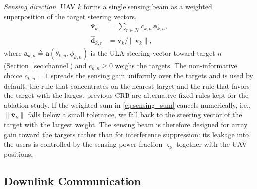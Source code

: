 \documentclass[conference]{IEEEtran}
\begin{document}
\emph{Sensing direction.} UAV $k$ forms a single sensing beam as a weighted superposition of the target steering vectors,
\begin{align}
\bar{\mathbf v}_k&=\sum_{n\in\mathcal N}c_{k,n}\,\mathbf a_{k,n},\label{eq:sensing_sum}\\
\hat{\mathbf d}_{k,r}&=\bar{\mathbf v}_k\big/\|\bar{\mathbf v}_k\|,\label{eq:sensing_dir}
\end{align}
where $\mathbf a_{k,n}\triangleq\mathbf a(\theta_{k,n},\phi_{k,n})$ is the ULA steering vector toward target $n$ (Section~\ref{sec:channel}) and $c_{k,n}\ge0$ weighs the targets. The non-informative choice $c_{k,n}=1$ spreads the sensing gain uniformly over the targets and is used by default; the rule that concentrates on the nearest target and the rule that favors the target with the largest previous CRB are alternative fixed rules kept for the ablation study. If the weighted sum in \eqref{eq:sensing_sum} cancels numerically, i.e., $\|\bar{\mathbf v}_k\|$ falls below a small tolerance, we fall back to the steering vector of the target with the largest weight. The sensing beam is therefore designed for array gain toward the targets rather than for interference suppression: its leakage into the users is controlled by the sensing power fraction $\varsigma_k$ together with the UAV positions.

\subsection{Downlink Communication}\label{sec:downlink}
\end{document}
